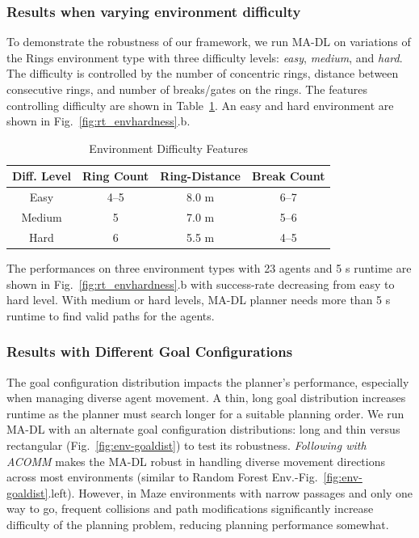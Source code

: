 \documentclass[letterpaper, 10 pt, conference]{ieeeconf}  %
\begin{document}
\subsubsection{Results when varying environment difficulty}

To demonstrate the robustness of our framework, we run MA-DL on variations of the Rings environment type with three difficulty levels: \textit{easy}, \textit{medium}, and \textit{hard}. The difficulty is controlled by the number of concentric rings, distance between consecutive rings, and number of breaks/gates on the rings. The features controlling difficulty are shown in Table~\ref{tab:hardnessEnvPara}. An easy and hard environment are shown in Fig.~\ref{fig:rt_envhardness}.b. 
\begin{table}[ht]
    \centering
    \begin{tabular}{c|c|c|c}
        \hline
         Diff. Level & Ring Count & Ring-Distance & Break Count \\
         \hline
         Easy & 4--5& 8.0 m & 6--7 \\
         \hline
         Medium & 5& 7.0 m & 5--6 \\
         \hline
         Hard & 6 & 5.5 m & 4--5\\
         \hline
    \end{tabular}
    \caption{Environment Difficulty Features}
    \label{tab:hardnessEnvPara}
\end{table}
 
The performances on three environment types with 23 agents and 5 s runtime are shown in Fig.~\ref{fig:rt_envhardness}.b with success-rate decreasing from easy to hard level. With medium or hard levels, MA-DL planner needs more than 5 s runtime to find valid paths for the agents.



\subsubsection{Results with Different Goal Configurations}

The goal configuration distribution impacts the planner's performance, especially when managing diverse agent movement. A thin, long goal distribution increases runtime as the planner must search longer for a suitable planning order. We run MA-DL with an alternate goal configuration distributions: long and thin versus rectangular (Fig.~\ref{fig:env-goaldist}) to test its robustness.
\textit{Following with ACOMM} makes the MA-DL robust in handling diverse movement directions across most environments (similar to Random Forest Env.-Fig.~\ref{fig:env-goaldist}.left). However, in Maze environments with narrow passages and only one way to go, frequent collisions and path modifications significantly increase difficulty of the planning problem, reducing planning performance somewhat.
\end{document}
